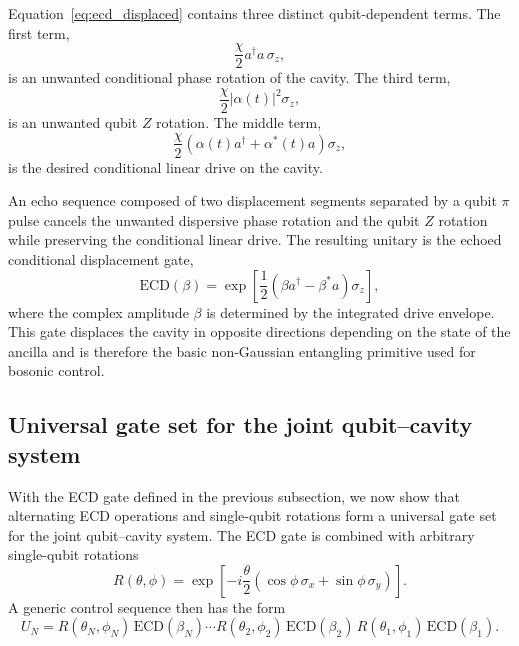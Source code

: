 Equation~\eqref{eq:ecd_displaced} contains three distinct qubit-dependent terms. The first term,
\begin{equation}
    \frac{\chi}{2}a^\dagger a\,\sigma_z,
\end{equation}
is an unwanted conditional phase rotation of the cavity. The third term,
\begin{equation}
    \frac{\chi}{2}|\alpha(t)|^2 \sigma_z,
\end{equation}
is an unwanted qubit \(Z\) rotation. The middle term,
\begin{equation}
    \frac{\chi}{2}
    \left(
        \alpha(t)a^\dagger + \alpha^*(t)a
    \right)\sigma_z,
    \label{eq:desired_conditional_drive}
\end{equation}
is the desired conditional linear drive on the cavity.

An echo sequence composed of two displacement segments separated by a qubit \(\pi\) pulse cancels the unwanted dispersive phase rotation and the qubit \(Z\) rotation while preserving the conditional linear drive. The resulting unitary is the echoed conditional displacement gate,
\begin{equation}
    \mathrm{ECD}(\beta)
    =
    \exp\!\left[
        \frac{1}{2}
        \left(
            \beta a^{\dagger}
            -
            \beta^{*}a
        \right)\sigma_z
    \right],
\end{equation}
where the complex amplitude \(\beta\) is determined by the integrated drive envelope. This gate displaces the cavity in opposite directions depending on the state of the ancilla and is therefore the basic non-Gaussian entangling primitive used for bosonic control.

\subsection{Universal gate set for the joint qubit--cavity system}

With the ECD gate defined in the previous subsection, we now show that alternating ECD operations and single-qubit rotations form a universal gate set for the joint qubit--cavity system. The ECD gate is combined with arbitrary single-qubit rotations
\begin{equation}
    R(\theta,\phi)
    =
    \exp\!\left[
        -i\frac{\theta}{2}
        \left(
            \cos\phi\,\sigma_x
            +
            \sin\phi\,\sigma_y
        \right)
    \right].
    \label{eq:single_qubit_rotation}
\end{equation}
A generic control sequence then has the form
\begin{equation}
    U_N
    =
    R(\theta_N,\phi_N)\,
    \mathrm{ECD}(\beta_N)
    \cdots
    R(\theta_2,\phi_2)\,
    \mathrm{ECD}(\beta_2)\,
    R(\theta_1,\phi_1)\,
    \mathrm{ECD}(\beta_1).
    \label{eq:ecd_circuit}
\end{equation}


